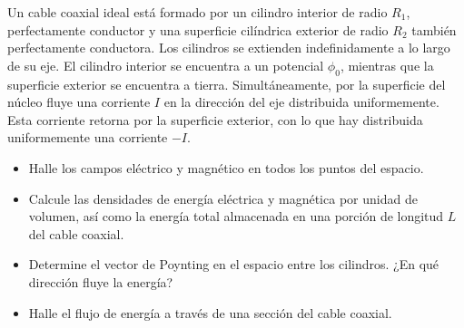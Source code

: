 \documentclass[11pt,fleqn]{book} %
\begin{document}
\begin{example}
Un cable coaxial ideal est\'a formado por un cilindro interior de radio $R_{1}$, perfectamente conductor y una superficie cil\'indrica exterior de radio $R_{2}$ tambi\'en perfectamente conductora. Los cilindros se extienden indefinidamente a lo largo de su eje.
El cilindro interior se encuentra a un potencial $\phi_{0}$, mientras que la superficie exterior se encuentra a tierra. Simult\'aneamente, por la superficie del n\'ucleo fluye una corriente $I$ en la direcci\'on del eje distribuida uniformemente. Esta corriente retorna por la superficie exterior, con lo que hay distribuida uniformemente una corriente $-I$.\\

\begin{itemize}
\item Halle los campos el\'ectrico y magn\'etico en todos los puntos del espacio.
\end{itemize}
\begin{itemize}
\item Calcule las densidades de energ\'ia el\'ectrica y magn\'etica por unidad de volumen, as\'i como la energ\'ia total almacenada en una porci\'on de longitud $L$ del cable coaxial.
\end{itemize}
\begin{itemize}
\item Determine el vector de Poynting en el espacio entre los cilindros. ¿En qu\'e direcci\'on fluye la energ\'ia?
\end{itemize}
\begin{itemize}
\item Halle el flujo de energ\'ia a trav\'es de una secci\'on del cable coaxial.
\end{itemize}


\end{example}
\end{document}
